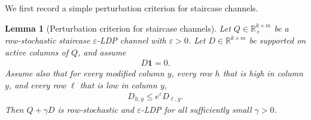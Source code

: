 \documentclass{article}
\theoremstyle{plain}
\newtheorem{lemma}[theorem]{Lemma}
\theoremstyle{definition}
\theoremstyle{plain}
\begin{document}
We first record a simple perturbation criterion for staircase channels.
\begin{lemma}[Perturbation criterion for staircase channels]
\label{lemma:perturbation-criterion-staircase}
Let $Q\in\mathbb{R}_+^{k\times m}$ be a row-stochastic staircase $\varepsilon$-LDP channel with $\varepsilon>0$. Let $D\in\mathbb{R}^{k\times m}$ be supported on active columns of $Q$, and assume
\begin{align*}
    D\mathbf{1}=0.
\end{align*}
Assume also that for every modified column $y$, every row $h$ that is high in column $y$, and every row $\ell$ that is low in column $y$,
\begin{align}
    \label{eq:perturbation-high-low-inequality}
    D_{h,y}\le e^\varepsilon D_{\ell,y}.
\end{align}
Then $Q+\gamma D$ is row-stochastic and $\varepsilon$-LDP for all sufficiently small $\gamma>0$.
\end{lemma}
\end{document}
